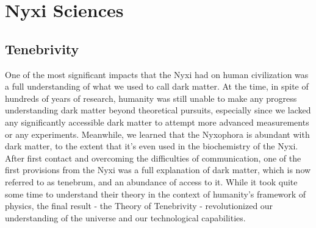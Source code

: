 
\part{Nyxi Sciences}



\chapter{Tenebrivity}

One of the most significant impacts that the Nyxi had on human civilization was
a full understanding of what we used to call dark matter. At the time, in spite
of hundreds of years of research, humanity was still unable to make any
progress understanding dark matter beyond theoretical pursuits, especially
since we lacked any significantly accessible dark matter to attempt more
advanced measurements or any experiments. Meanwhile, we learned that the
Nyxophora is abundant with dark matter, to the extent that it's even used in
the biochemistry of the Nyxi. After first contact and overcoming the
difficulties of communication, one of the first provisions from the Nyxi was a
full explanation of dark matter, which is now referred to as tenebrum, and an
abundance of access to it. While it took quite some time to understand their
theory in the context of humanity's framework of physics, the final result -
the Theory of Tenebrivity - revolutionized our understanding of the universe
and our technological capabilities.

